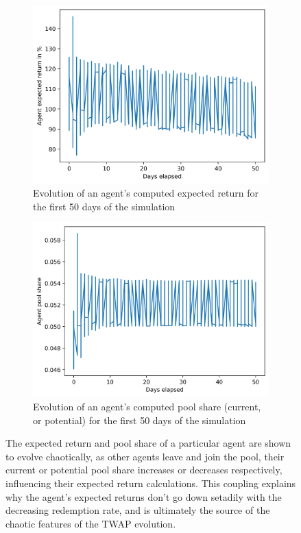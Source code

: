 \documentclass{article}
\begin{document}
    \begin{figure}[H]
      \captionsetup[subfigure]{position=b}
      \centering
      \begin{subfigure}[t]{.5\textwidth}
        \centering
        \captionsetup{margin=1.1cm}
        \includegraphics[width=1\linewidth]{figures/agent-return 2021-03-10 15-25-52.png}
        \caption{Evolution of an agent's computed expected return for the first 50 days of the simulation}
      \end{subfigure}%
      \begin{subfigure}[t]{.5\textwidth}
        \centering
        \captionsetup{margin=1.1cm}
        \includegraphics[width=1\linewidth]{figures/agent-pool-share 2021-03-10 15-25-52.png}
        \caption{Evolution of an agent's computed pool share (current, or potential) for the first 50 days of the simulation}
      \end{subfigure}
      \caption{The expected return and pool share of a particular agent are shown to evolve chaotically, as other agents leave and join the pool, their current or potential pool share increases or decreases respectively, influencing their expected return calculations. This coupling explains why the agent's expected returns don't go down setadily with the decreasing redemption rate, and is ultimately the source of the chaotic features of the TWAP evolution.}
    \end{figure}
\end{document}
